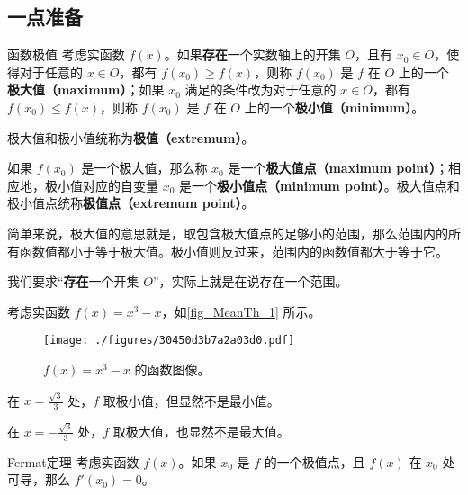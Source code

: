 

\subsection{一点准备}

\begin{definition}{函数极值}
考虑实函数 $f(x)$。如果\textbf{存在}一个实数轴上的开集 $O$，且有 $x_0\in O$，使得对于任意的 $x\in O$，都有 $f(x_0)\geq f(x)$，则称 $f(x_0)$ 是 $f$ 在 $O$ 上的一个\textbf{极大值（maximum）}；如果 $x_0$ 满足的条件改为对于任意的 $x\in O$，都有 $f(x_0)\leq f(x)$，则称 $f(x_0)$ 是 $f$ 在 $O$ 上的一个\textbf{极小值（minimum）}。

极大值和极小值统称为\textbf{极值（extremum）}。

如果 $f(x_0)$ 是一个极大值，那么称 $x_0$ 是一个\textbf{极大值点（maximum point）}；相应地，极小值对应的自变量 $x_0$ 是一个\textbf{极小值点（minimum point）}。极大值点和极小值点统称\textbf{极值点（extremum point）}。
\end{definition}


简单来说，极大值的意思就是，取包含极大值点的足够小的范围，那么范围内的所有函数值都小于等于极大值。极小值则反过来，范围内的函数值都大于等于它。

我们要求“\textbf{存在}一个开集 $O$”，实际上就是在说存在一个范围。

\begin{example}{}\label{ex_MeanTh_1}
考虑实函数 $f(x)=x^3-x$，如\autoref{fig_MeanTh_1} 所示。

\begin{figure}[ht]
\centering
\texttt{[image: ./figures/30450d3b7a2a03d0.pdf]}
\caption{$f(x)=x^3-x$ 的函数图像。} \label{fig_MeanTh_1}
\end{figure}

在 $x=\frac{\sqrt{3}}{3}$ 处，$f$ 取极小值，但显然不是最小值。

在 $x=-\frac{\sqrt{3}}{3}$ 处，$f$ 取极大值，也显然不是最大值。


\end{example}


\begin{theorem}{Fermat定理}\label{the_MeanTh_1}
考虑实函数 $f(x)$。如果 $x_0$ 是 $f$ 的一个极值点，且 $f(x)$ 在 $x_0$ 处可导，那么 $f'(x_0)=0$。
\end{theorem}

